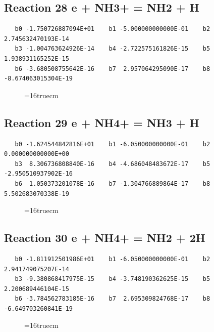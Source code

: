 \documentclass[12pt,dvipdfm]{article}
\begin{document}
\subsection{
Reaction 28 e + NH3+ = NH2 + H}
\begin{small}\begin{verbatim}
   b0 -1.750726887094E+01    b1 -5.000000000000E-01    b2  2.745632470193E-14
   b3 -1.004763624926E-14    b4 -2.722575161826E-15    b5  1.938931165252E-15
   b6 -3.680508755642E-16    b7  2.957064295090E-17    b8 -8.674063015304E-19
   \end{verbatim}\end{small}
\begin{figure}[h!]
\label{n2rates}
\epsfxsize=16truecm
\end{figure}
\newpage

\subsection{
Reaction 29 e + NH4+ = NH3 + H}
\begin{small}\begin{verbatim}
   b0 -1.624544842816E+01    b1 -6.050000000000E-01    b2  0.000000000000E+00
   b3  8.306736808840E-16    b4 -4.686048483672E-17    b5 -2.950510937902E-16
   b6  1.050373201078E-16    b7 -1.304766889864E-17    b8  5.502683070338E-19
   \end{verbatim}\end{small}
\begin{figure}[h!]
\label{n2rates}
\epsfxsize=16truecm
\end{figure}
\newpage

\subsection{
Reaction 30 e + NH4+ = NH2 + 2H}
\begin{small}\begin{verbatim}
   b0 -1.811912501986E+01    b1 -6.050000000000E-01    b2  2.941749075207E-14
   b3 -9.380868417975E-15    b4 -3.748190362625E-15    b5  2.200689446104E-15
   b6 -3.784562783185E-16    b7  2.695309824768E-17    b8 -6.649703260841E-19
   \end{verbatim}\end{small}
\begin{figure}[h!]
\label{n2rates}
\epsfxsize=16truecm
\end{figure}
\newpage
\end{document}
